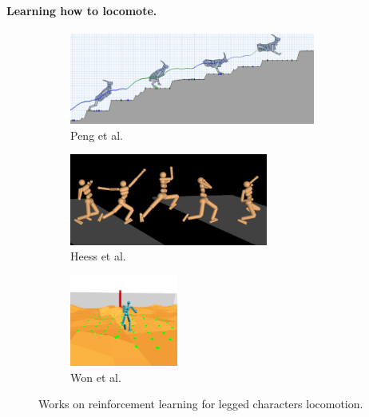 \paragraph{Learning how to locomote.}
\begin{figure}[h]
    \centering
    \captionsetup[subfigure]{justification=centering}
    \begin{subfigure}[t]{0.36\linewidth}
    \includegraphics[width=\textwidth,height=3cm]{Figures/Chapter_SOTA//terrain_adaptive.png}
    \caption{Peng et al. \cite{terrain_adaptative_locomotion}}
    \label{fig:rl_agnostic_0}
    \end{subfigure}
    \begin{subfigure}[t]{0.36\linewidth}
    \includegraphics[width=\textwidth,height=3cm]{Figures/Chapter_SOTA//deepMindPPO.png}
    \caption{Heess et al. \cite{ppo_rich_locomotion} }
    \label{fig:rl_agnostic_1}
    \end{subfigure}
    \begin{subfigure}[t]{0.25\linewidth}
    \includegraphics[width=\textwidth,height=3cm]{Figures/Chapter_SOTA//vae2.png}
    \caption{Won et al. \cite{VAE_jungdam_2022}}
    \label{fig:rl_agnostic_2}
    \end{subfigure}
    \label{fig:rl_agnostic}
    \caption{Works on reinforcement learning for legged characters locomotion.}
\end{figure}

